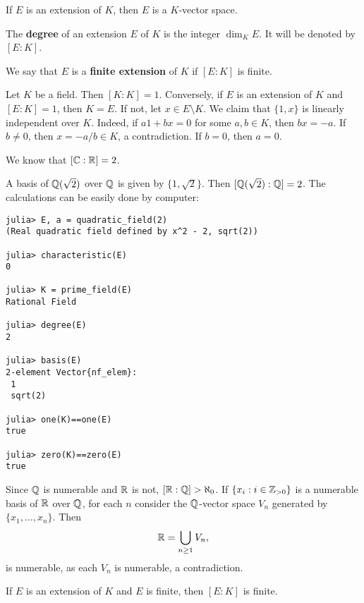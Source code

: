 If $E$ is an extension of $K$, then $E$ is a
$K$-vector space. 

\begin{definition}
	The \textbf{degree} of an extension $E$ of $K$ 
	is the integer $\dim_KE$. It will be denoted by $[E:K]$. 
\end{definition}

We say that $E$ is a \textbf{finite extension} of $K$ 
if $[E:K]$ is finite. 

\begin{example}
	Let $K$ be a field. Then $[K:K]=1$. Conversely, 
	if $E$ is an extension of $K$ and $[E:K]=1$, then $K=E$. 
	If not, let $x\in E\setminus K$. We claim that
	$\{1,x\}$ is linearly independent over $K$. Indeed, 
	if $a1+bx=0$ for some $a,b\in K$, then $bx=-a$. If 
	$b\ne 0$, then $x=-a/b\in K$, a contradiction. If $b=0$, then 
	$a=0$. 
\end{example}

We know that $[\mathbb{C}:\mathbb{R}]=2$. 

\begin{example}
	A basis of $\mathbb{Q}(\sqrt{2})$ over $\mathbb{Q}$ 
	is given by $\{1,\sqrt{2}\}$. Then 
	$[\mathbb{Q}(\sqrt{2}):\mathbb{Q}]=2$. The calculations 
	can be easily done by computer: 
\begin{lstlisting}
julia> E, a = quadratic_field(2)
(Real quadratic field defined by x^2 - 2, sqrt(2))

julia> characteristic(E)
0

julia> K = prime_field(E)
Rational Field

julia> degree(E)
2

julia> basis(E)
2-element Vector{nf_elem}:
 1
 sqrt(2)
 
julia> one(K)==one(E)
true

julia> zero(K)==zero(E)
true
\end{lstlisting}
\end{example}

\begin{example}
	Since $\mathbb{Q}$ is numerable and 
	$\mathbb{R}$ is not, $[\mathbb{R}:\mathbb{Q}]>\aleph_0$. If $\{x_i:i\in\mathbb{Z}_{>0}\}$ 
	is a numerable basis of $\mathbb{R}$ over $\mathbb{Q}$, for each
	$n$ consider the $\mathbb{Q}$-vector space
	$V_n$ generated by $\{x_1,\dots,x_n\}$. Then 
	\[
		\mathbb{R}=\bigcup_{n\geq1}V_n,
	\]
	is numerable, as each $V_n$ is numerable, a contradiction.
\end{example}

If $E$ is an extension of $K$ and $E$ is finite,
then $[E:K]$ is finite. 

